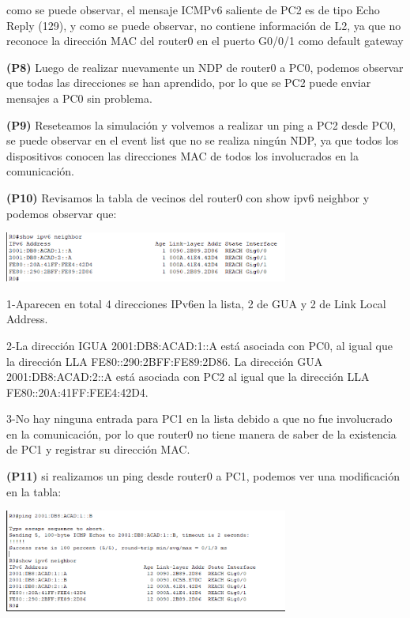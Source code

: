 \documentclass[12pt]{article}
\begin{document}
 como se puede observar, el mensaje ICMPv6 saliente de PC2 es de tipo Echo Reply (129), y como se puede observar, no contiene información de L2, ya que no reconoce la dirección MAC del router0 en el puerto G0/0/1 como default gateway
 
 \textbf{(P8)} Luego de realizar nuevamente un NDP de router0 a PC0, podemos observar que todas las direcciones se han aprendido, por lo que se PC2 puede enviar mensajes a PC0 sin problema.
 
 \textbf{(P9)} Reseteamos la simulación y volvemos a realizar un ping a PC2 desde PC0, se puede observar en el event list que no se realiza ningún NDP, ya que todos los dispositivos conocen las direcciones MAC de todos los involucrados en la comunicación.
 
 \textbf{(P10)} Revisamos la tabla de vecinos del router0 con show ipv6 neighbor y podemos observar que:
 
 \includegraphics[width=0.7\textwidth]{../tpipv6/imagenes/imagen5}
 
 1-Aparecen en total 4 direcciones IPv6en la lista, 2 de GUA y 2 de Link Local Address.
 
 2-La dirección IGUA 2001:DB8:ACAD:1::A está asociada con PC0, al igual que la dirección LLA FE80::290:2BFF:FE89:2D86. La dirección GUA 2001:DB8:ACAD:2::A está asociada con PC2 al igual que la dirección LLA FE80::20A:41FF:FEE4:42D4.
 
 3-No hay ninguna entrada para PC1 en la lista debido a que no fue involucrado en la comunicación, por lo que router0 no tiene manera de saber de la existencia de PC1 y registrar su dirección MAC.
 
 \textbf{(P11)} si realizamos un ping desde router0 a PC1, podemos ver una modificación en la tabla:
 
 \begin{center}
 	\includegraphics[width=0.7\textwidth]{../tpipv6/imagenes/imagen6}
 \end{center}
 
\end{document}
